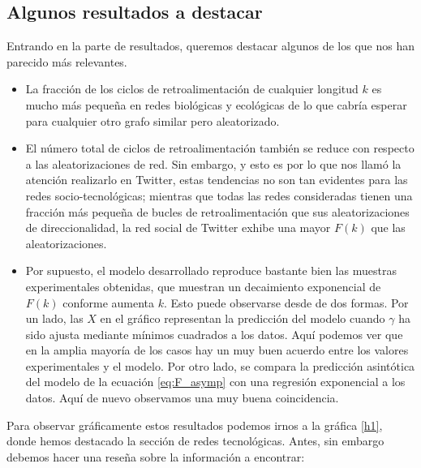 \documentclass[1p]{elsarticle}
\begin{document}
\subsection{Algunos resultados a destacar}
Entrando en la parte de resultados, queremos destacar algunos de los que nos han parecido más relevantes.
\begin{itemize}
	\item La fracción de los ciclos de retroalimentación de cualquier longitud $k$ es mucho más pequeña en redes biológicas y ecológicas de lo que cabría esperar para cualquier otro grafo similar pero aleatorizado.
	\item El número total de ciclos de retroalimentación también se reduce 
	con respecto a las aleatorizaciones de red. Sin embargo, y esto es por lo que nos llamó la atención realizarlo en Twitter, estas tendencias no son tan evidentes para las redes socio-tecnológicas; mientras que todas las redes consideradas tienen una fracción más pequeña de bucles de retroalimentación que sus aleatorizaciones de direccionalidad, la red social de Twitter exhibe una mayor $F(k)$ que las aleatorizaciones.
	\item Por supuesto, el modelo desarrollado reproduce bastante bien las muestras experimentales obtenidas, que muestran un decaimiento exponencial de $F(k)$ conforme aumenta $k$.
        Esto puede observarse desde de dos formas.
        Por un lado, las $X$ en el gráfico representan la predicción del modelo cuando $\gamma$ ha sido ajusta mediante mínimos cuadrados a los datos.
        Aquí podemos ver que en la amplia mayoría de los casos hay un muy buen acuerdo entre los valores experimentales y el modelo.
        Por otro lado, se compara la predicción asintótica del modelo de la ecuación \ref{eq:F_asymp} con una regresión exponencial a los datos.
        Aquí de nuevo observamos una muy buena coincidencia.
        
\end{itemize}

Para observar gráficamente estos resultados podemos irnos a la gráfica \ref{h1}, donde hemos destacado la sección de redes tecnológicas. Antes, sin embargo debemos hacer una reseña sobre la información a encontrar:
\end{document}

